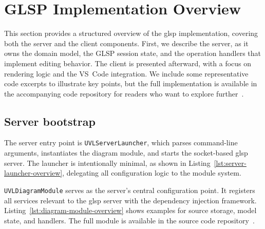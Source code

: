 \section{GLSP Implementation Overview}
\label{sec:impl_overview}

This section provides a structured overview of the \gls{glsp} implementation, covering both the server and the client components.
First, we describe the server, as it owns the domain model, the GLSP session state, and the operation handlers that implement editing behavior.
The client is presented afterward, with a focus on rendering logic and the VS~Code integration.
We include some representative code excerpts to illustrate key points, but the full implementation is available in the accompanying code repository for readers who want to explore further~\cite{ruider_xxnicksdaxxma-nick-ruider_2026}.



\subsection{Server bootstrap}
\label{subsec:impl_overview_server}

The server entry point is \texttt{UVLServerLauncher}, which parses command-line arguments, instantiates the diagram module, and starts the socket-based \gls{glsp} server.
The launcher is intentionally minimal, as shown in Listing~\ref{lst:server-launcher-overview}, delegating all configuration logic to the module system.

\texttt{UVLDiagramModule} serves as the server's central configuration point.
It registers all services relevant to the \gls{glsp} server with the dependency injection framework.
Listing~\ref{lst:diagram-module-overview} shows examples for source storage, model state, and handlers.
The full module is available in the source code repository~\cite{ruider_xxnicksdaxxma-nick-ruider_2026}.




